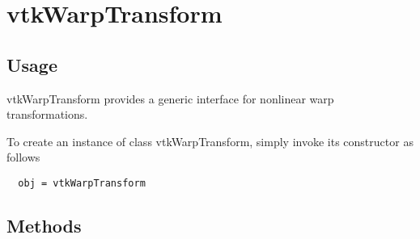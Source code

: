 \section{vtkWarpTransform}

\subsection{Usage}

 vtkWarpTransform provides a generic interface for nonlinear 
 warp transformations.

To create an instance of class vtkWarpTransform, simply
invoke its constructor as follows
\begin{verbatim}
  obj = vtkWarpTransform
\end{verbatim}
\subsection{Methods}

